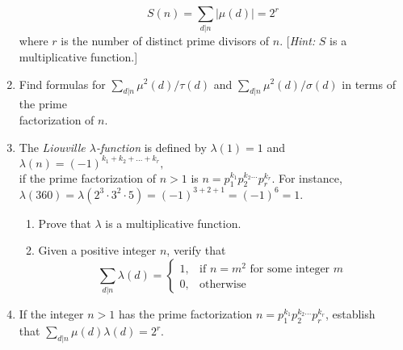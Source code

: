 \documentclass[11pt]{article}
\begin{document}
\begin{enumerate}
$$S(n)=\sum_{d|n}|\mu(d)|=2^r$$
where $r$ is the number of distinct prime divisors of $n$. [{\itshape Hint:} $S$ is a multiplicative function.] 
\item Find formulas for 
$\sum_{d|n}\mu^2(d)/\tau(d)$ and
$\sum_{d|n}\mu^2(d)/\sigma(d)$ in terms of the prime\\ factorization of $n$.
\item The {\it Liouville $\lambda$-function} is defined by $\lambda(1)=1$ and $\lambda(n)=(-1)^{k_1+k_2+\dots+k_r},$\\
if the prime factorization of $n>1$ is $n=p_1^{k_1}p_2^{k_2\dots}p_r^{k_r}.$ For instance,\\
$\lambda(360)=\lambda(2^3 \cdot 3^2 \cdot5)=(-1)^{3+2+1}=(-1)^6=1.$
\begin{enumerate}
\item Prove that $\lambda$ is a multiplicative function.
\item Given a positive integer $n$, verify that\\
$$\sum_{d|n}\lambda(d)=\begin{cases}
1,&\text{if $n=m^2$ for some integer $m$}\\
0,&\text{otherwise}
\end{cases} $$
\end{enumerate}
\item If the integer $n>1$ has the prime factorization $n=p_1^{k_1}p_2^{k_2\dots}p_r^{k_r}$, establish\\
that $\sum_{d|n}\mu(d)\lambda(d)=2^r.$
	
	
	
	
	
	
	
	
	
	
	
	
\end{enumerate}	
\end{document}
